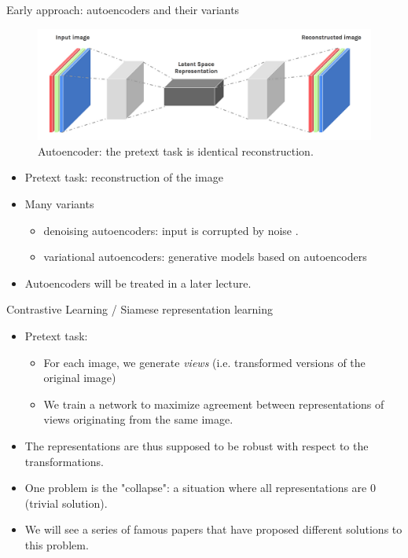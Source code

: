 \documentclass[xcolor=pdftex,dvipsnames,table]{beamer}
\begin{document}
\begin{frame}{Early approach: autoencoders and their variants}
\begin{figure}[htb]
   \centering
   \includegraphics[height=0.4\textheight]{../graphics/auto_encoder.png}
   \caption{Autoencoder: the pretext task is identical reconstruction.}
\end{figure}
\begin{itemize}
   \item Pretext task: reconstruction of the image
   \item Many variants
   \begin{itemize}
      \item denoising autoencoders: input is corrupted by noise \cite{Vincent}. 
      \item variational autoencoders: generative models based on autoencoders
   \end{itemize}
   \item Autoencoders will be treated in a later lecture. 
\end{itemize}
\end{frame}

\begin{frame}{Contrastive Learning / Siamese representation learning}
\begin{itemize}
   \item Pretext task: 
   \begin{itemize}
      \item For each image, we generate \textit{views} (i.e. transformed versions of the original image)
      \item We train a network to maximize agreement between representations of views originating from the same image. 
   \end{itemize}
   \item The representations are thus supposed to be robust with respect to the transformations. 
   \item One problem is the "collapse": a situation where all representations are 0 (trivial solution). 
   \item We will see a series of famous papers that have proposed different solutions to this problem.    
\end{itemize}
\end{frame}
\end{document}
